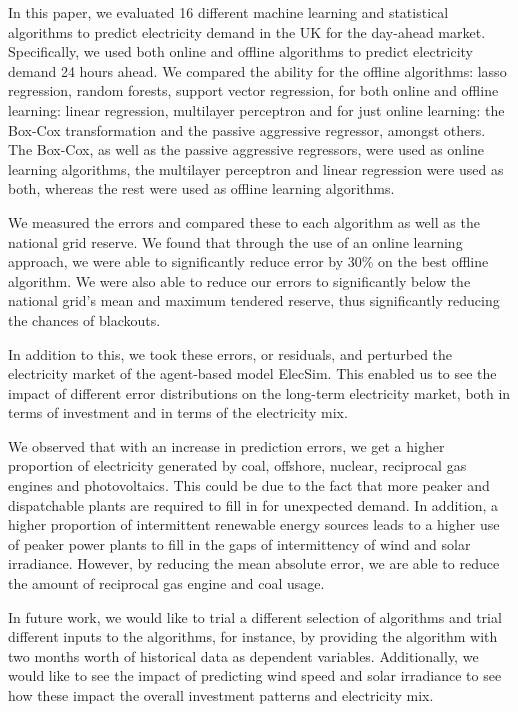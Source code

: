 \documentclass[final,3p,times,twocolumn,numbers]{elsarticle}
\begin{document}
In this paper, we evaluated 16 different machine learning and statistical algorithms to predict electricity demand in the UK for the day-ahead market. Specifically, we used both online and offline algorithms to predict electricity demand 24 hours ahead. We compared the ability for the offline algorithms: lasso regression, random forests, support vector regression, for both online and offline learning: linear regression, multilayer perceptron and for just online learning: the Box-Cox transformation and the passive aggressive regressor, amongst others. The Box-Cox, as well as the passive aggressive regressors, were used as online learning algorithms, the multilayer perceptron and linear regression were used as both, whereas the rest were used as offline learning algorithms.

We measured the errors and compared these to each algorithm as well as the national grid reserve. We found that through the use of an online learning approach, we were able to significantly reduce error by 30\% on the best offline algorithm.  We were also able to reduce our errors to significantly below the national grid's mean and maximum tendered reserve, thus significantly reducing the chances of blackouts.

In addition to this, we took these errors, or residuals, and perturbed the electricity market of the agent-based model ElecSim. This enabled us to see the impact of different error distributions on the long-term electricity market, both in terms of investment and in terms of the electricity mix.

We observed that with an increase in prediction errors, we get a higher proportion of electricity generated by coal, offshore, nuclear, reciprocal gas engines and photovoltaics. This could be due to the fact that more peaker and dispatchable plants are required to fill in for unexpected demand. In addition, a higher proportion of intermittent renewable energy sources leads to a higher use of peaker power plants to fill in the gaps of intermittency of wind and solar irradiance. However, by reducing the mean absolute error, we are able to reduce the amount of reciprocal gas engine and coal usage.

In future work, we would like to trial a different selection of algorithms and trial different inputs to the algorithms, for instance, by providing the algorithm with two months worth of historical data as dependent variables. Additionally, we would like to see the impact of predicting wind speed and solar irradiance to see how these impact the overall investment patterns and electricity mix. 
\end{document}
